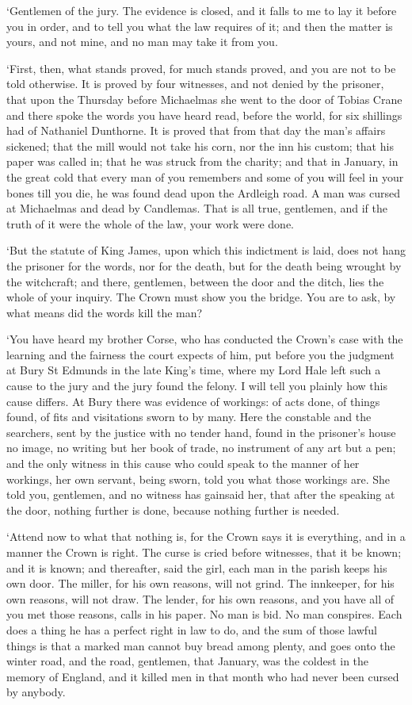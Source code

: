 \documentclass[11pt]{article}
\begin{document}
`Gentlemen of the jury. The evidence is closed, and it falls to me to lay it before you in order, and to tell you what the law requires of it; and then the matter is yours, and not mine, and no man may take it from you.

`First, then, what stands proved, for much stands proved, and you are not to be told otherwise. It is proved by four witnesses, and not denied by the prisoner, that upon the Thursday before Michaelmas she went to the door of Tobias Crane and there spoke the words you have heard read, before the world, for six shillings had of Nathaniel Dunthorne. It is proved that from that day the man's affairs sickened; that the mill would not take his corn, nor the inn his custom; that his paper was called in; that he was struck from the charity; and that in January, in the great cold that every man of you remembers and some of you will feel in your bones till you die, he was found dead upon the Ardleigh road. A man was cursed at Michaelmas and dead by Candlemas. That is all true, gentlemen, and if the truth of it were the whole of the law, your work were done.

`But the statute of King James, upon which this indictment is laid, does not hang the prisoner for the words, nor for the death, but for the death being wrought by the witchcraft; and there, gentlemen, between the door and the ditch, lies the whole of your inquiry. The Crown must show you the bridge. You are to ask, by what means did the words kill the man?

`You have heard my brother Corse, who has conducted the Crown's case with the learning and the fairness the court expects of him, put before you the judgment at Bury St Edmunds in the late King's time, where my Lord Hale left such a cause to the jury and the jury found the felony. I will tell you plainly how this cause differs. At Bury there was evidence of workings: of acts done, of things found, of fits and visitations sworn to by many. Here the constable and the searchers, sent by the justice with no tender hand, found in the prisoner's house no image, no writing but her book of trade, no instrument of any art but a pen; and the only witness in this cause who could speak to the manner of her workings, her own servant, being sworn, told you what those workings are. She told you, gentlemen, and no witness has gainsaid her, that after the speaking at the door, nothing further is done, because nothing further is needed.

`Attend now to what that nothing is, for the Crown says it is everything, and in a manner the Crown is right. The curse is cried before witnesses, that it be known; and it is known; and thereafter, said the girl, each man in the parish keeps his own door. The miller, for his own reasons, will not grind. The innkeeper, for his own reasons, will not draw. The lender, for his own reasons, and you have all of you met those reasons, calls in his paper. No man is bid. No man conspires. Each does a thing he has a perfect right in law to do, and the sum of those lawful things is that a marked man cannot buy bread among plenty, and goes onto the winter road, and the road, gentlemen, that January, was the coldest in the memory of England, and it killed men in that month who had never been cursed by anybody.
\end{document}
